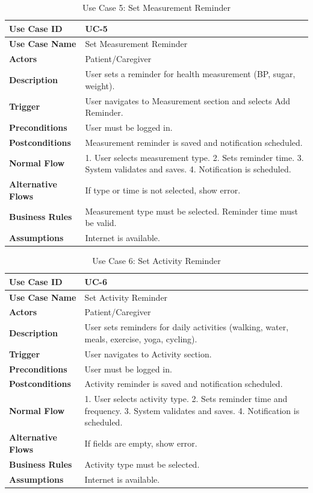 \documentclass[12pt, a4paper, oneside]{report}
\begin{document}
\begin{table}[H]
\centering
\caption{Use Case 5: Set Measurement Reminder}
\begin{tabularx}{\textwidth}{|l|X|}
\hline
\textbf{Use Case ID} & UC-5 \\ \hline
\textbf{Use Case Name} & Set Measurement Reminder \\ \hline
\textbf{Actors} & Patient/Caregiver \\ \hline
\textbf{Description} & User sets a reminder for health measurement (BP, sugar, weight). \\ \hline
\textbf{Trigger} & User navigates to Measurement section and selects Add Reminder. \\ \hline
\textbf{Preconditions} & User must be logged in. \\ \hline
\textbf{Postconditions} & Measurement reminder is saved and notification scheduled. \\ \hline
\textbf{Normal Flow} & 1. User selects measurement type. 2. Sets reminder time. 3. System validates and saves. 4. Notification is scheduled. \\ \hline
\textbf{Alternative Flows} & If type or time is not selected, show error. \\ \hline
\textbf{Business Rules} & Measurement type must be selected. Reminder time must be valid. \\ \hline
\textbf{Assumptions} & Internet is available. \\ \hline
\end{tabularx}
\end{table}

\begin{table}[H]
\centering
\caption{Use Case 6: Set Activity Reminder}
\begin{tabularx}{\textwidth}{|l|X|}
\hline
\textbf{Use Case ID} & UC-6 \\ \hline
\textbf{Use Case Name} & Set Activity Reminder \\ \hline
\textbf{Actors} & Patient/Caregiver \\ \hline
\textbf{Description} & User sets reminders for daily activities (walking, water, meals, exercise, yoga, cycling). \\ \hline
\textbf{Trigger} & User navigates to Activity section. \\ \hline
\textbf{Preconditions} & User must be logged in. \\ \hline
\textbf{Postconditions} & Activity reminder is saved and notification scheduled. \\ \hline
\textbf{Normal Flow} & 1. User selects activity type. 2. Sets reminder time and frequency. 3. System validates and saves. 4. Notification is scheduled. \\ \hline
\textbf{Alternative Flows} & If fields are empty, show error. \\ \hline
\textbf{Business Rules} & Activity type must be selected. \\ \hline
\textbf{Assumptions} & Internet is available. \\ \hline
\end{tabularx}
\end{table}
\end{document}
